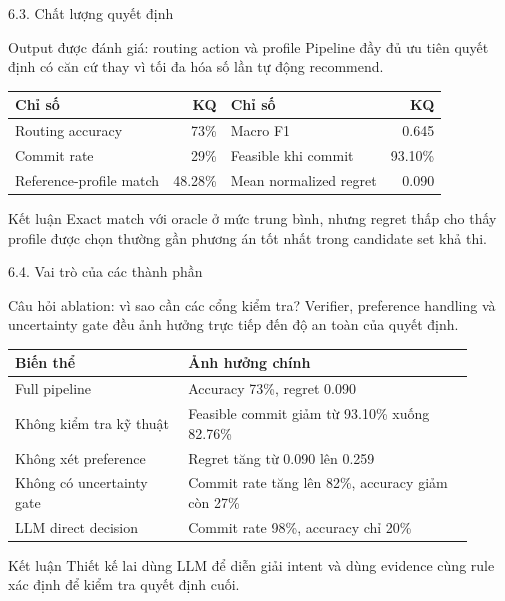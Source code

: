 \begin{frame}[t,shrink=8]{6.3. Chất lượng quyết định}
\small
\begin{block}{Output được đánh giá: routing action và profile}
Pipeline đầy đủ ưu tiên quyết định có căn cứ thay vì tối đa hóa số lần tự động recommend.
\end{block}
\centering
\begin{tabular}{lr@{\qquad}lr}
\toprule
\textbf{Chỉ số} & \textbf{KQ} & \textbf{Chỉ số} & \textbf{KQ} \\
\midrule
Routing accuracy & 73\% & Macro F1 & 0.645 \\
Commit rate & 29\% & Feasible khi commit & 93.10\% \\
Reference-profile match & 48.28\% & Mean normalized regret & 0.090 \\
\bottomrule
\end{tabular}
\vspace{0.3cm}
\begin{exampleblock}{Kết luận}
Exact match với oracle ở mức trung bình, nhưng regret thấp cho thấy profile được chọn thường gần phương án tốt nhất trong candidate set khả thi.
\end{exampleblock}
\end{frame}

\begin{frame}[t,shrink=8]{6.4. Vai trò của các thành phần}
\small
\begin{block}{Câu hỏi ablation: vì sao cần các cổng kiểm tra?}
Verifier, preference handling và uncertainty gate đều ảnh hưởng trực tiếp đến độ an toàn của quyết định.
\end{block}
\centering
\begin{tabular}{p{0.34\linewidth}p{0.57\linewidth}}
\toprule
\textbf{Biến thể} & \textbf{Ảnh hưởng chính} \\
\midrule
Full pipeline & Accuracy 73\%, regret 0.090 \\
Không kiểm tra kỹ thuật & Feasible commit giảm từ 93.10\% xuống 82.76\% \\
Không xét preference & Regret tăng từ 0.090 lên 0.259 \\
Không có uncertainty gate & Commit rate tăng lên 82\%, accuracy giảm còn 27\% \\
LLM direct decision & Commit rate 98\%, accuracy chỉ 20\% \\
\bottomrule
\end{tabular}
\vspace{0.2cm}
\begin{exampleblock}{Kết luận}
Thiết kế lai dùng LLM để diễn giải intent và dùng evidence cùng rule xác định để kiểm tra quyết định cuối.
\end{exampleblock}
\end{frame}

